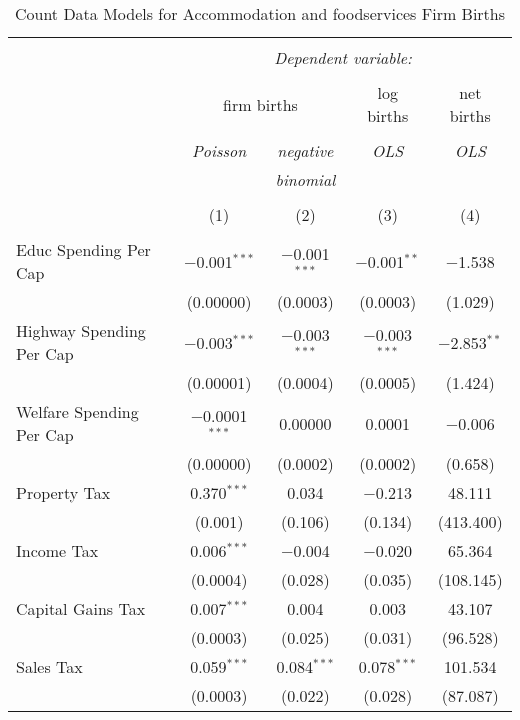 
\begin{table}[!htbp] \centering 
  \caption{Count Data Models for Accommodation and foodservices Firm Births} 
  \label{} 
\begin{tabular}{@{\extracolsep{5pt}}lcccc} 
\\[-1.8ex]\hline 
\hline \\[-1.8ex] 
 & \multicolumn{4}{c}{\textit{Dependent variable:}} \\ 
\cline{2-5} 
\\[-1.8ex] & \multicolumn{2}{c}{firm births} & log births & net births \\ 
\\[-1.8ex] & \textit{Poisson} & \textit{negative} & \textit{OLS} & \textit{OLS} \\ 
 & \textit{} & \textit{binomial} & \textit{} & \textit{} \\ 
\\[-1.8ex] & (1) & (2) & (3) & (4)\\ 
\hline \\[-1.8ex] 
 Educ Spending Per Cap & $-$0.001$^{***}$ & $-$0.001$^{***}$ & $-$0.001$^{**}$ & $-$1.538 \\ 
  & (0.00000) & (0.0003) & (0.0003) & (1.029) \\ 
  Highway Spending Per Cap  & $-$0.003$^{***}$ & $-$0.003$^{***}$ & $-$0.003$^{***}$ & $-$2.853$^{**}$ \\ 
  & (0.00001) & (0.0004) & (0.0005) & (1.424) \\ 
  Welfare Spending Per Cap  & $-$0.0001$^{***}$ & 0.00000 & 0.0001 & $-$0.006 \\ 
  & (0.00000) & (0.0002) & (0.0002) & (0.658) \\ 
  Property Tax & 0.370$^{***}$ & 0.034 & $-$0.213 & 48.111 \\ 
  & (0.001) & (0.106) & (0.134) & (413.400) \\ 
  Income Tax & 0.006$^{***}$ & $-$0.004 & $-$0.020 & 65.364 \\ 
  & (0.0004) & (0.028) & (0.035) & (108.145) \\ 
  Capital Gains Tax & 0.007$^{***}$ & 0.004 & 0.003 & 43.107 \\ 
  & (0.0003) & (0.025) & (0.031) & (96.528) \\ 
  Sales Tax & 0.059$^{***}$ & 0.084$^{***}$ & 0.078$^{***}$ & 101.534 \\ 
  & (0.0003) & (0.022) & (0.028) & (87.087) \\ 

\end{tabular}
\end{table}
